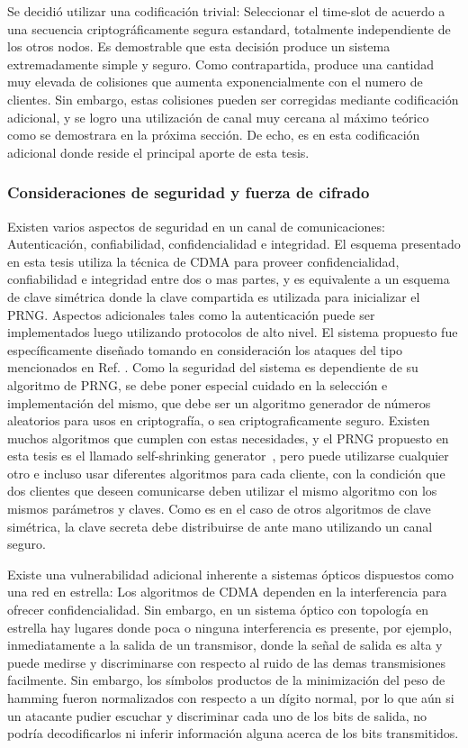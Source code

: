 Se decidió utilizar una codificación trivial: Seleccionar el time-slot de acuerdo a una secuencia criptográficamente segura estandard, totalmente independiente de los otros nodos. Es demostrable que esta decisión produce un sistema extremadamente simple y seguro. Como contrapartida, produce una cantidad muy elevada de colisiones que aumenta exponencialmente con el numero de clientes. Sin embargo, estas colisiones pueden ser corregidas mediante codificación adicional, y se logro una utilización de canal muy cercana al máximo teórico como se demostrara en la próxima sección. De echo, es en esta codificación adicional donde reside el principal aporte de esta tesis.

\subsubsection{Consideraciones de seguridad y fuerza de cifrado}\label{Seguridad-fuerza}
Existen varios aspectos de seguridad en un canal de comunicaciones: Autenticación, confiabilidad, confidencialidad e integridad.
El esquema presentado en esta tesis utiliza la técnica de CDMA para proveer confidencialidad, confiabilidad e integridad entre dos o mas partes, y es equivalente a un esquema de clave simétrica donde la clave compartida es utilizada para inicializar el PRNG. Aspectos adicionales tales como la autenticación puede ser implementados luego utilizando protocolos de alto nivel.
El sistema propuesto fue específicamente diseñado tomando en consideración los ataques del tipo mencionados en Ref. \cite{Shake:05}.
Como la seguridad del sistema es dependiente de su algoritmo de PRNG, se debe poner especial cuidado en la selección e implementación del mismo, que debe ser un algoritmo generador de números aleatorios para usos en criptografía, o sea criptograficamente seguro. Existen muchos algoritmos que cumplen con estas necesidades, y el PRNG propuesto en esta tesis es el llamado self-shrinking generator~\cite{Meier:94}, pero puede utilizarse cualquier otro e incluso usar diferentes algoritmos para cada cliente, con la condición que dos clientes que deseen comunicarse deben utilizar el mismo algoritmo con los mismos parámetros y claves.
Como es en el caso de otros algoritmos de clave simétrica, la clave secreta debe distribuirse de ante mano utilizando un canal seguro.

Existe una vulnerabilidad adicional inherente a sistemas ópticos dispuestos como una red en estrella: Los algoritmos de CDMA dependen en la interferencia para ofrecer confidencialidad. Sin embargo, en un sistema óptico con topología en estrella hay lugares donde poca o ninguna interferencia es presente, por ejemplo, inmediatamente a la salida de un transmisor, donde la señal de salida es alta y puede medirse y discriminarse con respecto al ruido de las demas transmisiones facilmente.
Sin embargo, los símbolos productos de la minimización del peso de hamming fueron normalizados con respecto a un dígito normal, por lo que aún si un atacante pudier escuchar y discriminar cada uno de los bits de salida, no podría decodificarlos ni inferir información alguna acerca de los bits transmitidos.

